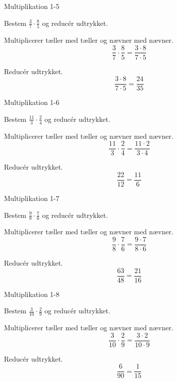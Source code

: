\documentclass{article}
\begin{document}
\newpage

\begin{exercise}{Multiplikation 1-5}
	
	Bestem $\frac{3}{7} \cdot \frac{8}{5}$ og reducér udtrykket.
	
	
	\hint
	
	Multiplicerer tæller med tæller og nævner med nævner.
	\[
	\frac{3}{7} \cdot \frac{8}{5} = \frac{3 \cdot 8}{7 \cdot 5} 
	\]
	
	\hint
	
	Reducér udtrykket.
	\[
	\frac{3 \cdot 8}{7 \cdot 5} = \frac{24}{35} 
	\]
	
	
\end{exercise}

\newpage

\begin{exercise}{Multiplikation 1-6}
	
	Bestem $\frac{11}{3} \cdot \frac{2}{4}$ og reducér udtrykket.
	
	
	\hint
	
	Multiplicerer tæller med tæller og nævner med nævner.
	\[
	\frac{11}{3} \cdot \frac{2}{4}= \frac{11 \cdot 2}{3 \cdot 4} 
	\]
	
	\hint
	
	Reducér udtrykket.
	\[
	\frac{22}{12} = \frac{11}{6}
	\]
	
	
\end{exercise}

\newpage

\begin{exercise}{Multiplikation 1-7}
	
	Bestem $\frac{9}{8} \cdot \frac{7}{6}$ og reducér udtrykket.
	
	
	\hint
	
	Multiplicerer tæller med tæller og nævner med nævner.
	\[
	\frac{9}{8} \cdot \frac{7}{6} = \frac{9 \cdot 7}{8 \cdot 6} 
	\]
	
	\hint
	
	Reducér udtrykket.
	\[
	\frac{63}{48} = \frac{21}{16}
	\]
	
	
\end{exercise}

\newpage

\begin{exercise}{Multiplikation 1-8}
	
	Bestem $\frac{3}{10} \cdot \frac{2}{9}$ og reducér udtrykket.
	
	
	\hint
	
	Multiplicerer tæller med tæller og nævner med nævner.
	\[
	\frac{3}{10} \cdot \frac{2}{9} = \frac{3 \cdot 2}{10 \cdot 9} 
	\]
	
	\hint
	
	Reducér udtrykket.
	\[
	\frac{6}{90} = \frac{1}{15}
	\]
	
	
\end{exercise}
\end{document}

